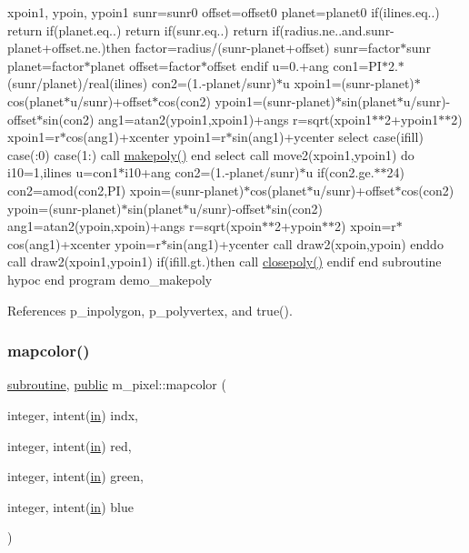 xpoin1, ypoin, ypoin1 sunr=sunr0 offset=offset0 planet=planet0 if(ilines.\+eq..) return if(planet.\+eq..) return if(sunr.\+eq..) return if(radius.\+ne..\+and.\+sunr-\/planet+offset.ne.)then factor=radius/(sunr-\/planet+offset) sunr=factor$\ast$sunr planet=factor$\ast$planet offset=factor$\ast$offset endif u=0.+ang con1=P\+I$\ast$2.$\ast$(sunr/planet)/real(ilines) con2=(1.-\/planet/sunr)$\ast$u xpoin1=(sunr-\/planet)$\ast$cos(planet$\ast$u/sunr)+offset$\ast$cos(con2) ypoin1=(sunr-\/planet)$\ast$sin(planet$\ast$u/sunr)-\/offset$\ast$sin(con2) ang1=atan2(ypoin1,xpoin1)+angs r=sqrt(xpoin1$\ast$$\ast$2+ypoin1$\ast$$\ast$2) xpoin1=r$\ast$cos(ang1)+xcenter ypoin1=r$\ast$sin(ang1)+ycenter select case(ifill) case(\+:0) case(1\+:) call \hyperlink{namespacem__pixel_ab7128437f95b40004bf73fc6e3f597f8}{makepoly()} end select call move2(xpoin1,ypoin1) do i10=1,ilines u=con1$\ast$i10+ang con2=(1.-\/planet/sunr)$\ast$u if(con2.\+ge.$\ast$$\ast$24) con2=amod(con2,\+P\+I) xpoin=(sunr-\/planet)$\ast$cos(planet$\ast$u/sunr)+offset$\ast$cos(con2) ypoin=(sunr-\/planet)$\ast$sin(planet$\ast$u/sunr)-\/offset$\ast$sin(con2) ang1=atan2(ypoin,xpoin)+angs r=sqrt(xpoin$\ast$$\ast$2+ypoin$\ast$$\ast$2) xpoin=r$\ast$cos(ang1)+xcenter ypoin=r$\ast$sin(ang1)+ycenter call draw2(xpoin,ypoin) enddo call draw2(xpoin1,ypoin1) if(ifill.\+gt.)then call \hyperlink{namespacem__pixel_ab3dc83b63d2ab1bf3f63932abca4245d}{closepoly()} endif end subroutine hypoc end program demo\+\_\+makepoly 

References p\+\_\+inpolygon, p\+\_\+polyvertex, and true().

\mbox{\label{namespacem__pixel_a3422f51171f30979868a8075690da9f5}} 
\subsubsection{\texorpdfstring{mapcolor()}{mapcolor()}}
{\footnotesize\ttfamily \hyperlink{M__stopwatch_83_8txt_acfbcff50169d691ff02d4a123ed70482}{subroutine}, \hyperlink{M__stopwatch_83_8txt_a2f74811300c361e53b430611a7d1769f}{public} m\+\_\+pixel\+::mapcolor (\begin{DoxyParamCaption}\item[{integer, intent(\hyperlink{M__journal_83_8txt_afce72651d1eed785a2132bee863b2f38}{in})}]{indx,  }\item[{integer, intent(\hyperlink{M__journal_83_8txt_afce72651d1eed785a2132bee863b2f38}{in})}]{red,  }\item[{integer, intent(\hyperlink{M__journal_83_8txt_afce72651d1eed785a2132bee863b2f38}{in})}]{green,  }\item[{integer, intent(\hyperlink{M__journal_83_8txt_afce72651d1eed785a2132bee863b2f38}{in})}]{blue }\end{DoxyParamCaption})}



